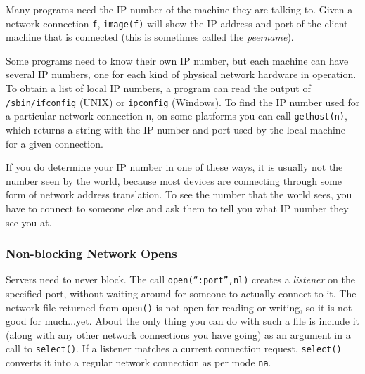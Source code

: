 Many programs need the IP number of the
machine they are talking to. Given a network connection {\texttt f},
\texttt{image(f)}
will show the IP address and port of the client machine that is connected
(this is sometimes called the \textit{peername}). 

Some programs need to know their own IP number, but
each machine can have several IP numbers, one for each kind of
physical network hardware in operation.
To obtain a list of local IP numbers, a program can read the output of
\texttt{/sbin/ifconfig} (UNIX) or \texttt{ipconfig} (Windows). To
find the IP number used for a particular network connection \texttt{n},
on some platforms you can call \texttt{gethost(n)}, which returns a string
with the IP number and port used by the local machine for a given connection.

If you do determine your IP number in one of these ways, it is usually not
the number seen by the world, because most devices are connecting through
some form of network address translation.
To see the number that the world sees, you have to connect to
someone else and ask them to tell you what IP number they see you at.


\subsubsection[Non{}-blocking Network Opens]{\sffamily Non-blocking
Network Opens}
Servers need to never block. The call
\texttt{open({\textquotedblleft}:port{\textquotedblright},{\textquotedbl}nl{\textquotedbl})}
creates a \textit{listener} on the specified port, without waiting
around for someone to actually connect to it. The network file returned
from \texttt{open()} is not open for reading or writing, so it is not
good for much...yet. About the only thing you can do with such a file
is include it (along with any other network connections you have going)
as an argument in a call to \texttt{select()}. If a listener matches a
current connection request, \texttt{select()} converts it into a
regular network connection as per mode
\texttt{{\textquotedbl}na{\textquotedbl}}.

